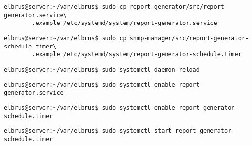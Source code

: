 	\lstset{style=commands}
	\begin{lstlisting}[caption={Kopieren des Serviceprogrammes.}]
		elbrus@server:~/var/elbrus$ sudo cp report-generator/src/report-generator.service\
		.example /etc/systemd/system/report-generator.service
	\end{lstlisting}
	
	\lstset{style=commands}
	\begin{lstlisting}[caption={Kopieren des Zeitplanungsprogrammes.}]
		elbrus@server:~/var/elbrus$ sudo cp snmp-manager/src/report-generator-schedule.timer\
		.example /etc/systemd/system/report-generator-schedule.timer
	\end{lstlisting}
	
	\lstset{style=commands}
	\begin{lstlisting}[caption={Neuladen des 'systemctl' Deamons.}]
		elbrus@server:~/var/elbrus$ sudo systemctl daemon-reload
	\end{lstlisting}
	
	\lstset{style=commands}
	\begin{lstlisting}[caption={Aktivieren des Serviceprogrammes.}]
		elbrus@server:~/var/elbrus$ sudo systemctl enable report-generator.service
	\end{lstlisting}
	
	\lstset{style=commands}
	\begin{lstlisting}[caption={Aktivieren des Zeitplanungsprogrammes.}]
		elbrus@server:~/var/elbrus$ sudo systemctl enable report-generator-schedule.timer
	\end{lstlisting}
	
	\lstset{style=commands}
	\begin{lstlisting}[caption={Starten des Zeitplanungsprogrammes.}]
		elbrus@server:~/var/elbrus$ sudo systemctl start report-generator-schedule.timer
	\end{lstlisting}